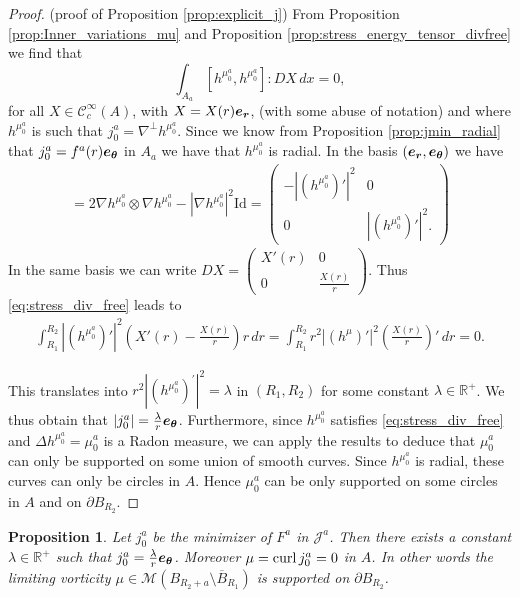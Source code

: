 \documentclass[12pt,reqno]{amsart}
\newtheorem{proposition}[theorem]{Proposition}
\def\C{{\mathcal C}}
\renewcommand{\vec}[1]{\text{\boldmath $#1$}}
\def\curl{{\rm curl\,}}
\def \p {\partial}
\newcommand{\R}{\mathbb{R}}
\numberwithin{equation}{section}
\begin{document}
\begin{proof}(proof of Proposition \ref{prop:explicit_j})
From Proposition \ref{prop:Inner_variations_mu} and Proposition \ref{prop:stress_energy_tensor_divfree} we find that
\begin{equation}\label{eq:stress_div_free}
\int_{A_a} [h^{\mu_0^a},h^{\mu_0^a}]: DX \, dx=0, 
\end{equation}
for all \(X\in \C^\infty_c(A)\), with \(X=X(r)\vec{e_r}\), (with some abuse of notation) and where \(h^{\mu_0^a}\) is such that \(j_0^a=\nabla^\perp h^{\mu_0^a}\). Since we know from Proposition \ref{prop:jmin_radial} that \(j_0^a=f^a(r) \vec{e_\theta}\) in \(A_a\) we have that \(h^{\mu_0^a}\) is radial. In the basis \((\vec{e_r},\vec{e_\theta})\) we have
\begin{align*}
[h^{\mu_0^a},h^{\mu_0^a}]= 2\nabla h^{\mu_0^a} \otimes \nabla h^{\mu_0^a} -|\nabla h^{\mu_0^a}|^2 \text{Id}=\begin{pmatrix}
-|(h^{\mu_0^a})'|^2 &0 \\
0 & |(h^{\mu_0^a})'|^2.
\end{pmatrix}
\end{align*}
In the same basis we can write \( DX =\begin{pmatrix}
X'(r) &0 \\
0 & \frac{X(r)}{r}
\end{pmatrix}\). Thus \eqref{eq:stress_div_free} leads to 
\begin{align*}
\int_{R_1}^{R_2} |(h^{\mu_0^a})'|^2 \left(X'(r)-\frac{X(r)}{r}\right) r \, dr = \int_{R_1}^{R_2} r^2|(h^{\mu})'|^2 \left(\frac{X(r)}{r}\right)' \, dr =0.
\end{align*}

This translates into \(r^2|{(h^{\mu_0^a})}^{'}|^2=\lambda\) in \((R_1,R_2)\) for some constant \(\lambda\in \R^+\). We thus obtain that \(|j_0^a|=\frac{\lambda}{r}\vec{e_\theta}\). Furthermore, since \(h^{\mu_0^a}\) satisfies \eqref{eq:stress_div_free} and \(\Delta h^{\mu_0^a}=\mu_0^a\) is a Radon measure, we can apply the results \cite[Theorems 1.3, 1.4, 1.6]{Rodiac_2016} to deduce that \(\mu_0^a\) can only be supported on some union of smooth curves. Since \(h^{\mu_0^a}\) is radial, these curves can only be circles in \(A\). Hence \(\mu_0^a\) can be only supported on some circles in \(A\) and on \(\p B_{R_2}\).
\end{proof}

\begin{proposition}
Let \(j_0^a\) be the minimizer of \(F^a\)  in \(\mathcal{J}^a\). Then there exists a constant \(\lambda \in \R^+\) such that \(j_0^a=\frac{\lambda}{r}\vec{e_\theta}\). Moreover \(\mu=\curl j_0^a=0\) in \(A\). In other words the limiting vorticity \(\mu \in \mathcal{M}(B_{R_2+a}\setminus \overline{B}_{R_1})\) is supported on \(\p B_{R_2}\).
\end{proposition}
\end{document}
